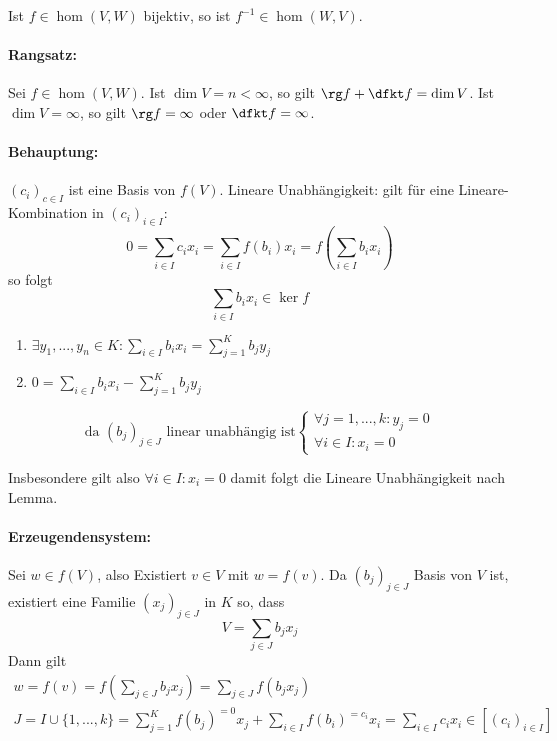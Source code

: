 	Ist $ f\in \hom (V,W) $ bijektiv, so ist $ f^{-1}\in \hom (W,V) $.
\paragraph{Rangsatz: }
	Sei $ f\in \hom (V,W) $. Ist $ \dim V = n < \infty $,  so gilt $\rg f + \dfkt f = \dim V$.  Ist $ \dim V = \infty $, so gilt $ \rg f = \infty $ oder $ \dfkt f = \infty $.


\paragraph{Behauptung: }
	$(c_i)_{c\in I}$ ist eine Basis von $f(V)$.	Lineare Unabhängigkeit: gilt für eine Lineare-Kombination in $(c_i)_{i\in I}$:
	\begin{equation*}
		0=\sum_{i\in I}c_ix_i = \sum_{i\in I}f(b_i)x_i = f(\sum_{i\in I}b_ix_i)
		\end{equation*}
		so folgt
		\begin{equation*}
		\sum_{i\in I}b_ix_i \in \ker f
		\end{equation*}
		\begin{enumerate}[$\Rightarrow$]
			\item $\exists y_1,...,y_n\in K:\sum_{i\in I}b_ix_i=\sum_{j=1}^{K}b_jy_j$\\
			\item $0 = \sum_{i\in I}b_ix_i - \sum_{j=1}^{K}b_jy_j$
		\end{enumerate}
		
			\begin{equation*}
			\text{da } (b_j)_{j\in J} \text{ linear unabhängig ist}
			\begin{cases}
			\forall j = 1, ... ,k:y_j=0\\
			\forall i\in I: x_i = 0
			\end{cases}
			\end{equation*}
			
	Insbesondere gilt also $\forall i\in I: x_i = 0$ damit folgt die Lineare Unabhängigkeit nach Lemma.
	
	\paragraph{Erzeugendensystem:}
		Sei $w\in f(V)$, also Existiert $v\in V$ mit $w = f(v)$. Da $(b_j)_{j\in J}$ Basis von $V$ ist, existiert eine Familie $(x_j)_{j\in J}$ in $K$ so, dass 
		\begin{equation*}
			V = \sum_{j\in J} b_jx_j
		\end{equation*}
		Dann gilt
	\begin{gather*}
			w = f(v) = f(\sum_{j\in J} b_jx_j) = \sum_{j\in J}f(b_jx_j)\\
			J=I \cup\{{1,...,k\}} = \sum_{j=1}^{K}f(b_j)^{=0}x_j + \sum_{i\in I}f(b_i)^{=c_i}x_i = \sum_{i\in I}c_ix_i\in[(c_i)_{i\in I}]
	\end{gather*}
			
